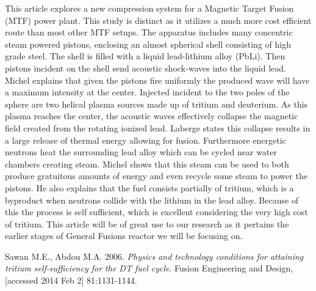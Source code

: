 \documentclass[12pt]{article}
\begin{document}
\begin{singlespace}
\begin{adjustwidth}{2.5em}{0pt}
This article explores a new compression system for a Magnetic Target Fusion (MTF) power plant.  This study is distinct as it utilizes a much more cost efficient route than most other MTF setups.  The apparatus includes many concentric steam powered pistons, enclosing an almost spherical shell consisting of high grade steel.  The shell is filled with a liquid lead-lithium alloy (PbLi).  Then pistons incident on the shell send acoustic shock-waves into the liquid lead.  Michel explains that given the pistons fire uniformly the produced wave will have a maximum intensity at the center.  Injected incident to the two poles of the sphere are two helical plasma sources made up of tritium and deuterium.  As this plasma reaches the center, the acoustic waves effectively collapse the magnetic field created from the rotating ionized lead.  Laberge states this collapse results in a large release of thermal energy allowing for fusion.  Furthermore energetic neutrons heat the surrounding lead alloy which can be cycled near water chambers creating steam. Michel shows that this steam can be used to both produce gratuitous amounts of energy and even recycle some steam to power the pistons.  He also explains that the fuel consists partially of tritium, which is a byproduct when neutrons collide with the lithium in the lead alloy.  Because of this the process is self sufficient, which is excellent considering the very high cost of tritium.  This article will be of great use to our research as it pertains the earlier stages of General Fusions reactor we will be focusing on.   \newline
\end{adjustwidth}

\noindent
Sawan M.E., Abdou M.A. 2006. \textit{Physics and technology conditions for attaining tritium self-sufficiency for the DT fuel cycle}. Fusion Engineering and Design, [accessed 2014 Feb 2] 81:1131-1144.



\begin{adjustwidth}{2.5em}{0pt}


\end{adjustwidth}
\end{singlespace}
\end{document}
